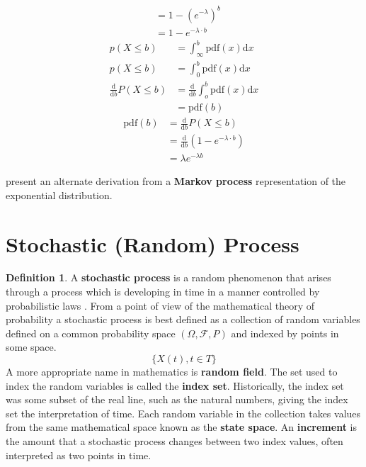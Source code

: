 \documentclass[12pt]{article}
\theoremstyle{plain}
\theoremstyle{definition}
\newtheorem{definition}{Definition}
\theoremstyle{remark}
\begin{document}
\begin{enumerate}
\begin{align*}
              & = 1 - \left(e^{-\lambda}\right)^b \\
              & = 1 - e^{-\lambda\cdot b}
\end{align*}
\begin{align*}
  p(X \leq b) & = \int_{\infty}^b \mathrm{pdf}(x)\mathrm{d}x \\
  p(X \leq b) & = \int_0^b \mathrm{pdf}(x)\mathrm{d}x \\
  \frac{\mathrm{d}}{\mathrm{d}b} P(X \leq b) & = \frac{\mathrm{d}}{\mathrm{d}b}
                                               \int_o^b\mathrm{pdf}(x)\mathrm{d}x \\
                                             & = \mathrm{pdf}(b)
\end{align*}
\begin{align*}
\mathrm{pdf}(b) & = \frac{\mathrm{d}}{\mathrm{d}b} P(X \leq b) \\
                & = \frac{\mathrm{d}}{\mathrm{d}b}
                  \left(1-e^{-\lambda\cdot b}\right) \\
  & = \lambda e^{-\lambda b}
\end{align*}

\end{enumerate}
\cite{yue18} present an alternate derivation from a \textbf{Markov process}
representation of the exponential distribution.

\section{Stochastic (Random) Process}

\begin{definition}
  A \textbf{stochastic process} is a random phenomenon that arises through a
  process which is developing in time in a manner controlled by probabilistic
  laws \citep{par99}.
  From a point of view of the mathematical theory of probability a stochastic
  process is best defined as a collection of random variables defined on a
  common probability space $(\Omega,\mathcal{F}, P)$ and indexed by points in some space.
  \begin{equation*}
    \{X(t), t \in T\}
  \end{equation*}
  A more appropriate name in mathematics is \textbf{random field}.
  The set used to index the random variables is called the \textbf{index set}.
  Historically, the index set was some subset of the real line, such as the
  natural numbers, giving the index set the interpretation of time.
  Each random variable in the collection takes values from the same mathematical
  space known as the \textbf{state space}.
  An \textbf{increment} is the amount that a stochastic process changes between
  two index values, often interpreted as two points in time.
\end{definition}
\end{document}
